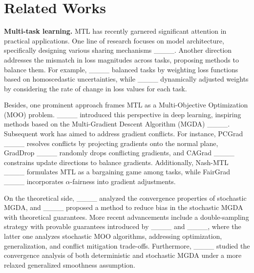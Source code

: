 \section{Related Works}
\textbf{Multi-task learning.} MTL has recently garnered significant attention in practical applications. One line of research focuses on model architecture, specifically designing various sharing mechanisms ____. Another direction addresses the mismatch in loss magnitudes across tasks, proposing methods to balance them. For example, ____ balanced tasks by weighting loss functions based on homoscedastic uncertainties, while ____ dynamically adjusted weights by considering the rate of change in loss values for each task.

Besides, one prominent approach frames MTL as a Multi-Objective Optimization (MOO) problem. ____ introduced this perspective in deep learning, inspiring methods based on the Multi-Gradient Descent Algorithm (MGDA) ____. Subsequent work has aimed to address gradient conflicts. For instance, PCGrad ____ resolves conflicts by projecting gradients onto the normal plane, GradDrop ____ randomly drops conflicting gradients, and CAGrad ____ constrains update directions to balance gradients. Additionally, Nash-MTL ____ formulates MTL as a bargaining game among tasks, while FairGrad ____ incorporates $\alpha$-fairness into gradient adjustments.

On the theoretical side, ____ analyzed the convergence properties of stochastic MGDA, and ____ proposed a method to reduce bias in the stochastic MGDA with theoretical guarantees. More recent advancements include a double-sampling strategy with provable guarantees introduced by ____ and ____, where the latter one analyzes stochastic MOO algorithms, addressing optimization, generalization, and conflict mitigation trade-offs. Furthermore, ____ studied the convergence analysis of both deterministic and stochastic MGDA under a more relaxed generalized smoothness assumption.

